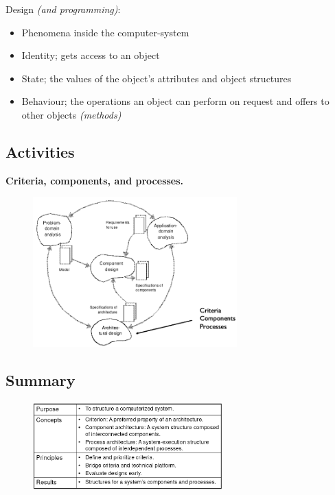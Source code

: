 \noindent Design \textit{(and programming)}:
\begin{itemize}
    \item Phenomena inside the computer-system
    \item Identity; gets access to an object
    \item State; the values of the object's attributes and object structures
    \item Behaviour; the operations an object can perform on request and offers to other objects \textit{(methods)}
\end{itemize}

\subsection{Activities}
\textbf{Criteria, components, and processes.}
\begin{figure}[h!]
    \centering
    \includegraphics[width=0.7\textwidth]{figures/methodcircular.png}
\end{figure}

\subsection{Summary}

\begin{figure}[H]
    \centering
    \includegraphics[width=0.65\textwidth]{figures/architecturaldesignsummary.png}
\end{figure}

